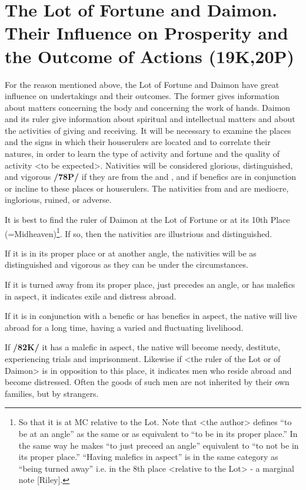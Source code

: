 \section{The Lot of Fortune and Daimon. Their Influence on Prosperity and the Outcome of Actions (19K,20P)}
 
For the reason mentioned above, the Lot of Fortune and Daimon have great influence on undertakings and their outcomes. The former gives information about matters concerning the body and concerning the work of hands. Daimon and its ruler give information about spiritual and intellectual matters and about the activities of giving and receiving. It will be necessary to examine the places and the signs in which their houserulers are located and to correlate their natures, in order to learn the type of activity and fortune and the quality of activity <to be expected>. Nativities will be considered glorious, distinguished, and vigorous \textbf{/78P/} if they are from the \Sun\xspace and \Moon, and if benefics are in conjunction or incline to these places or houserulers. The nativities from \Saturn\xspace and \Mars\xspace are mediocre, inglorious, ruined, or adverse. 

It is best to find the ruler of Daimon at the Lot of Fortune or at its 10th Place (=Midheaven)\footnote{So that it is at MC relative to the Lot. Note that <the author> defines “to be at an angle” as the same or as equivalent to “to be in its proper place.” In the same way he makes “to just preceed an angle” equivalent to “to not be in its proper place.” “Having malefics in aspect” is in the same category as “being turned away” i.e. in the 8th place <relative to the Lot> - a marginal note [Riley].}. If so, then the nativities are illustrious and
distinguished. 

If it is in its proper place or at another angle, the nativities will be as distinguished and vigorous as they can be under the circumstances. 

If it is turned away from its proper place, just precedes an angle, or has malefics in aspect, it indicates exile and distress abroad. 

If it is in conjunction with a benefic or has benefics in aspect, the native will live abroad for a long time, having a varied and fluctuating livelihood. 

If \textbf{/82K/} it has a malefic in aspect, the native will become needy, destitute, experiencing trials and imprisonment. Likewise if <the ruler of the Lot or of Daimon> is in opposition to this place, it indicates men who reside abroad and become distressed. Often the goods of such men are not inherited by their own families, but by strangers.

\newpage